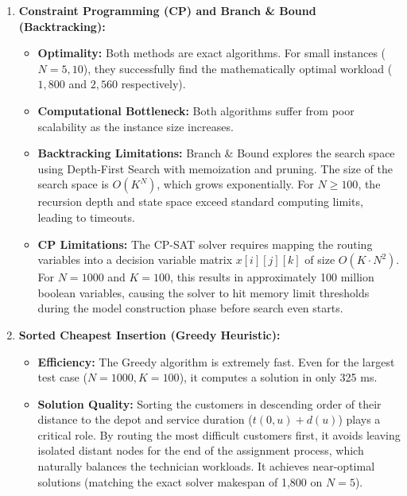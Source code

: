 \documentclass[11pt]{article}
\begin{document}
\begin{enumerate}
    \item \textbf{Constraint Programming (CP) and Branch \& Bound (Backtracking):}
    \begin{itemize}
        \item \textbf{Optimality:} Both methods are exact algorithms. For small instances ($N=5, 10$), they successfully find the mathematically optimal workload ($1,800$ and $2,560$ respectively).
        \item \textbf{Computational Bottleneck:} Both algorithms suffer from poor scalability as the instance size increases.
        \item \textbf{Backtracking Limitations:} Branch \& Bound explores the search space using Depth-First Search with memoization and pruning. The size of the search space is $O(K^N)$, which grows exponentially. For $N \ge 100$, the recursion depth and state space exceed standard computing limits, leading to timeouts.
        \item \textbf{CP Limitations:} The CP-SAT solver requires mapping the routing variables into a decision variable matrix $x[i][j][k]$ of size $O(K \cdot N^2)$. For $N=1000$ and $K=100$, this results in approximately 100 million boolean variables, causing the solver to hit memory limit thresholds during the model construction phase before search even starts.
    \end{itemize}
    
    \item \textbf{Sorted Cheapest Insertion (Greedy Heuristic):}
    \begin{itemize}
        \item \textbf{Efficiency:} The Greedy algorithm is extremely fast. Even for the largest test case ($N=1000, K=100$), it computes a solution in only 325 ms.
        \item \textbf{Solution Quality:} Sorting the customers in descending order of their distance to the depot and service duration ($t(0, u) + d(u)$) plays a critical role. By routing the most difficult customers first, it avoids leaving isolated distant nodes for the end of the assignment process, which naturally balances the technician workloads. It achieves near-optimal solutions (matching the exact solver makespan of 1,800 on $N=5$).
    \end{itemize}
    

\end{enumerate}
\end{document}
